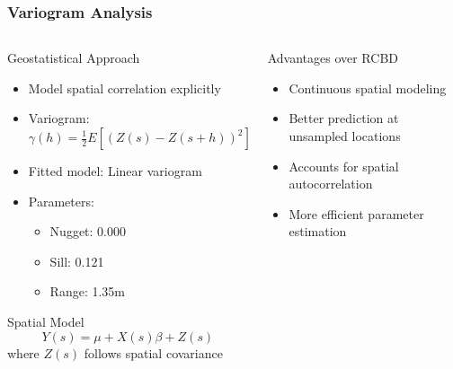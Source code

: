 \documentclass[aspectratio=43]{beamer}
\begin{document}
\begin{frame}
    \frametitle{Variogram Analysis}
    
    \begin{columns}[T]
        \begin{column}{0.5\textwidth}
            \begin{block}{Geostatistical Approach}
                \begin{itemize}
                    \item Model spatial correlation explicitly
                    \item Variogram: $\gamma(h) = \frac{1}{2}E[(Z(s) - Z(s+h))^2]$
                    \item Fitted model: Linear variogram
                    \item Parameters:
                    \begin{itemize}
                        \scriptsize
                        \item Nugget: 0.000
                        \item Sill: 0.121
                        \item Range: 1.35m
                    \end{itemize}
                \end{itemize}
            \end{block}
            
            \begin{block}{Spatial Model}
                $$Y(s) = \mu + X(s)\beta + Z(s)$$
                where $Z(s)$ follows spatial covariance
            \end{block}
        \end{column}
        
        \begin{column}{0.5\textwidth}
            \begin{block}{Advantages over RCBD}
                \begin{itemize}
                    \item Continuous spatial modeling
                    \item Better prediction at unsampled locations
                    \item Accounts for spatial autocorrelation
                    \item More efficient parameter estimation
                \end{itemize}
            \end{block}
            

\end{column}
\end{columns}
\end{frame}
\end{document}
